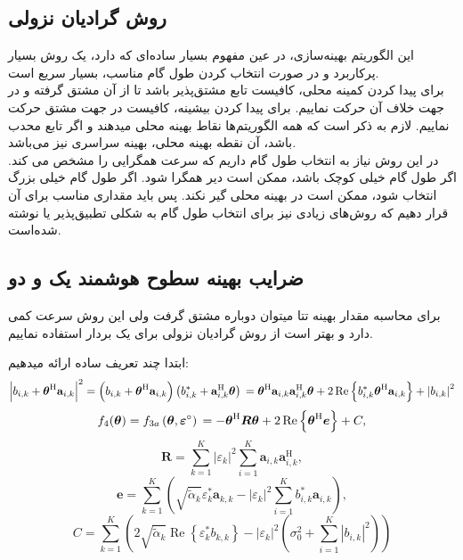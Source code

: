 \subsection{روش گرادیان نزولی}
این الگوریتم بهینه‌سازی، در عین مفهوم بسیار ساده‌ای که دارد، یک روش بسیار پرکاربرد و در صورت انتخاب کردن طول گام مناسب، بسیار سریع است.\\
برای پیدا کردن کمینه محلی، کافیست تابع مشتق‌پذیر باشد تا از آن مشتق گرفته و در جهت خلاف آن حرکت نماییم. 
برای پیدا کردن بیشینه، کافیست در جهت مشتق حرکت نماییم.
لازم به ذکر است که همه الگوریتم‌ها نقاط بهینه‌ محلی میدهند و اگر تابع محدب باشد، آن نقطه بهینه محلی، بهینه سراسری نیز می‌باشد.\\
در این روش نیاز به انتخاب طول گام داریم که سرعت همگرایی را مشخص می کند. اگر طول گام خیلی کوچک باشد، ممکن است دیر همگرا شود. اگر طول گام خیلی بزرگ انتخاب شود، ممکن است در بهینه محلی گیر نکند. پس باید مقداری مناسب برای آن قرار دهیم که روش‌های زیادی نیز برای انتخاب طول گام به شکلی تطبیق‌پذیر یا  نوشته شده‌است.

\newpage
\subsection{ضرایب بهینه سطوح هوشمند یک و دو}
برای محاسبه مقدار بهینه تتا میتوان دوباره مشتق گرفت ولی این روش سرعت کمی دارد و بهتر است از روش گرادیان نزولی برای یک بردار استفاده نماییم.

ابتدا چند تعریف ساده ارائه میدهیم:
\[
	\left|b_{i, k}+\boldsymbol{\theta}^{\mathrm{H}} \mathbf{a}_{i, k}\right|^{2}  =\left(b_{i, k}+\boldsymbol{\theta}^{\mathrm{H}} \mathbf{a}_{i, k}\right)\left(b_{i, k}^{*}+\mathbf{a}_{i, k}^{\mathrm{H}} \boldsymbol{\theta}\right) \\
	 =\boldsymbol{\theta}^{\mathrm{H}} \mathbf{a}_{i, k} \mathbf{a}_{i, k}^{\mathrm{H}} \boldsymbol{\theta}+2 \operatorname{Re}\left\{b_{i, k}^{*} \boldsymbol{\theta}^{\mathrm{H}} \mathbf{a}_{i, k}\right\}+\left|b_{i, k}\right|^{2}
\]
\[	f_{4}(\boldsymbol{\theta})  =f_{3 a}\left(\boldsymbol{\theta}, \boldsymbol{\varepsilon}^{\circ}\right) \\
	 =-\boldsymbol{\theta}^{\mathrm{H}} \boldsymbol{R} \boldsymbol{\theta}+2 \operatorname{Re}\left\{\boldsymbol{\theta}^{\mathrm{H}} \boldsymbol{e}\right\}+C,
\]
\[	\boldsymbol{R}  =\sum_{k=1}^{K}\left|\varepsilon_{k}\right|^{2} \sum_{i=1}^{K} \mathbf{a}_{i, k} \mathbf{a}_{i, k}^{\mathrm{H}},
\]
\[
	\boldsymbol{e}  =\sum_{k=1}^{K}\left(\sqrt{\tilde{\alpha}_{k}} \varepsilon_{k}^{*} \mathbf{a}_{k, k}-\left|\varepsilon_{k}\right|^{2} \sum_{i=1}^{K} b_{i, k}^{*} \mathbf{a}_{i, k}\right),
\]
\[
	C  =\sum_{k=1}^{K}\left(2 \sqrt{\tilde{\alpha}_{k}} \operatorname{Re}\left\{\varepsilon_{k}^{*} b_{k, k}\right\}-\left|\varepsilon_{k}\right|^{2}\left(\sigma_{0}^{2}+\sum_{i=1}^{K}\left|b_{i, k}\right|^{2}\right)\right)
\]

